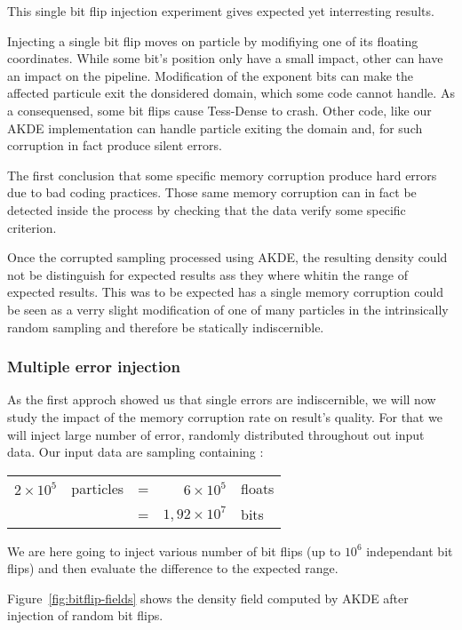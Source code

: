 \documentclass[10pt,a4paper,twoside,twocolumn]{article}
\begin{document}
This single bit flip injection experiment gives expected yet interresting
results.

Injecting a single bit flip moves on particle by modifiying one of its floating
coordinates. While some bit's position only have a small impact, other can have
an impact on the pipeline. Modification of the exponent bits can make the
affected particule exit the donsidered domain, which some code cannot handle.
As a consequensed, some bit flips cause Tess-Dense to crash. Other code, like
our AKDE implementation can handle particle exiting the domain and, for such
corruption in fact produce silent errors.

The first conclusion that some specific memory corruption produce hard errors
due to bad coding practices. Those same memory corruption can in fact be
detected inside the process by checking that the data verify some specific
criterion.

Once the corrupted sampling processed using AKDE, the resulting density could
not be distinguish for expected results ass they where whitin the range of
expected results. This was to be expected has a single memory corruption could
be seen as a verry slight modification of one of many particles in the
intrinsically random sampling and therefore be statically indiscernible.

\subsubsection{Multiple error injection}

As the first approch showed us that single errors are indiscernible, we will now
study the impact of the memory corruption rate on result's quality. For that we
will inject large number of error, randomly distributed throughout out input
data. Our input data are sampling containing :
\begin{table}[!h]
	\centering
	\begin{tabular}{rlcrl}
		$2\times10^5$	& particles	&=	& $6\times10^5$			& floats	\\
									&						&=	& $1,92\times10^7$	& bits
	\end{tabular}
\end{table}
We are here going to inject various number of bit flips (up to $10^6$
independant bit flips) and then evaluate the difference to the expected range.

Figure~\ref{fig:bitflip-fields} shows the density field computed by AKDE after
injection of random bit flips.
\end{document}
